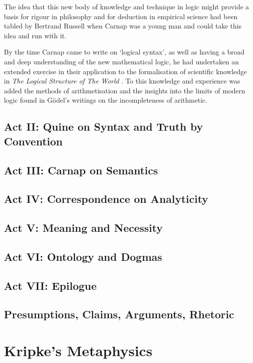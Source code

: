 The idea that this new body of knowledge and technique in logic might provide a basis for rigour in philosophy and for deduction in empirical science had been tabled by Bertrand Russell \cite{russell21} when Carnap was a young man and could take this idea and run with it.

By the time Carnap came to write on `logical syntax', as well as having a broad and deep understanding of the new mathematical logic, he had undertaken an extended exercise in their application to the formalisation of scientific knowledge in {\it The Logical Structure of The World} \cite{carnap28}.
To this knowledge and experience was added the methods of arithmetisation and the insights into the limits of modern logic found in Gödel's writings on the incompleteness of arithmetic.

\section{Act II: Quine on Syntax and Truth by Convention}

\section{Act III: Carnap on Semantics}

\section{Act IV: Correspondence on Analyticity}

\section{Act V: Meaning and Necessity}

\section{Act VI: Ontology and Dogmas}

\section{Act VII: Epilogue}

\section{Presumptions, Claims, Arguments, Rhetoric}

\chapter{Kripke's Metaphysics}

